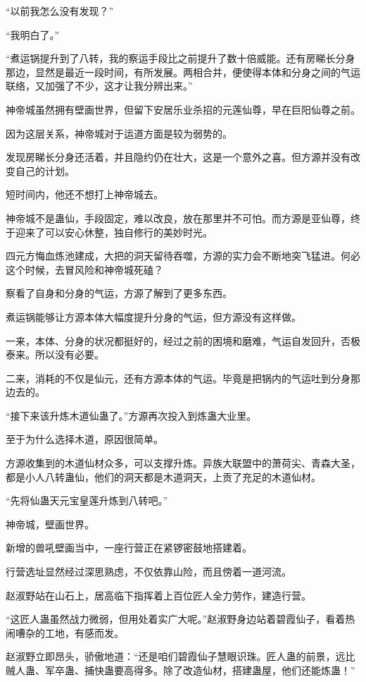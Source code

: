 \begin{this_body}
“以前我怎么没有发现？”

“我明白了。”

“煮运锅提升到了八转，我的察运手段比之前提升了数十倍威能。还有房睇长分身那边，显然是最近一段时间，有所发展。两相合并，便使得本体和分身之间的气运联络，又加强了不少，这才让我分辨出来。”

神帝城虽然拥有壁画世界，但留下安居乐业杀招的元莲仙尊，早在巨阳仙尊之前。

因为这层关系，神帝城对于运道方面是较为弱势的。

发现房睇长分身还活着，并且隐约仍在壮大，这是一个意外之喜。但方源并没有改变自己的计划。

短时间内，他还不想打上神帝城去。

神帝城不是蛊仙，手段固定，难以改良，放在那里并不可怕。而方源是亚仙尊，终于迎来了可以安心休整，独自修行的美妙时光。

四元方悔血炼池建成，大把的洞天留待吞噬，方源的实力会不断地突飞猛进。何必这个时候，去冒风险和神帝城死磕？

察看了自身和分身的气运，方源了解到了更多东西。

煮运锅能够让方源本体大幅度提升分身的气运，但方源没有这样做。

一来，本体、分身的状况都挺好的，经过之前的困境和磨难，气运自发回升，否极泰来。所以没有必要。

二来，消耗的不仅是仙元，还有方源本体的气运。毕竟是把锅内的气运吐到分身那边去的。

“接下来该升炼木道仙蛊了。”方源再次投入到炼蛊大业里。

至于为什么选择木道，原因很简单。

方源收集到的木道仙材众多，可以支撑升炼。异族大联盟中的萧荷尖、青森大圣，都是小人八转蛊仙，他们的洞天都是木道洞天，上贡了充足的木道仙材。

“先将仙蛊天元宝皇莲升炼到八转吧。”

神帝城，壁画世界。

新增的兽吼壁画当中，一座行营正在紧锣密鼓地搭建着。

行营选址显然经过深思熟虑，不仅依靠山险，而且傍着一道河流。

赵淑野站在山石上，居高临下指挥着上百位匠人全力劳作，建造行营。

“这匠人蛊虽然战力微弱，但用处着实广大呢。”赵淑野身边站着碧霞仙子，看着热闹嘈杂的工地，有感而发。

赵淑野立即昂头，骄傲地道：“还是咱们碧霞仙子慧眼识珠。匠人蛊的前景，远比贼人蛊、军卒蛊、捕快蛊要高得多。除了改造仙材，搭建蛊屋，他们还能炼蛊！”


\end{this_body}
